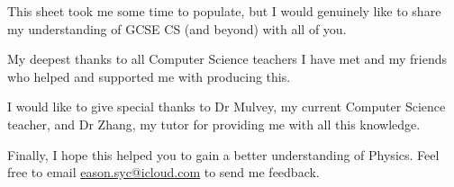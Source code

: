 \documentclass[8pt]{article}
\theoremstyle{remark}
\begin{document}
        This sheet took me some time to populate, but I would genuinely like to share my understanding of GCSE CS (and beyond) with all of you.
        
        My deepest thanks to all Computer Science teachers I have met and my friends who helped and supported me with producing this.
        
        I would like to give special thanks to Dr Mulvey, my current Computer Science teacher, and Dr Zhang, my tutor for providing me with all this knowledge.

        Finally, I hope this helped you to gain a better understanding of Physics. Feel free to email \href{eason.syc@icloud.com}{eason.syc@icloud.com} to send me feedback.
\end{document}
